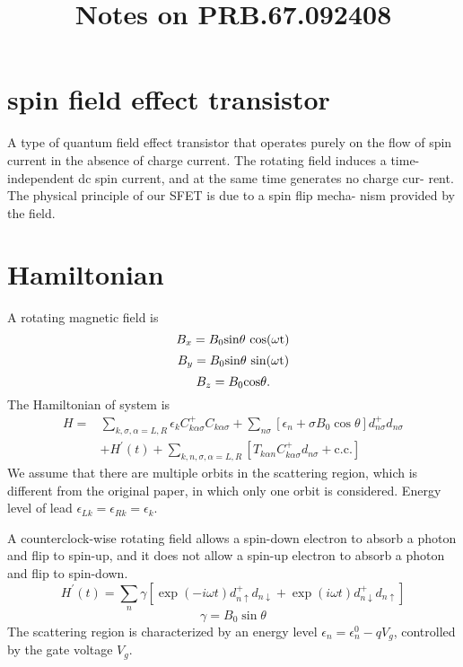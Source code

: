 \documentclass[11pt,a4paper]{article}
\begin{document}
\title{Notes on PRB.67.092408}
\date{}
\maketitle

\section{spin field effect transistor}
A type of quantum field effect transistor that operates purely on the flow of spin current in the absence of charge current. The rotating field induces a time-independent dc spin current, and at the same time generates no charge cur- rent. The physical principle of our SFET is due to a spin flip mecha- nism provided by the field.
\section{Hamiltonian}
A rotating magnetic field is
\begin{equation}
B_{x} = B_{0}\rm{sin}\theta ~\rm{cos}(\omega t)
\end{equation}
\begin{equation}
B_{y} = B_{0}\rm{sin}\theta~\rm{sin}(\omega t)
\end{equation}
\begin{equation}
B_{z} = B_{0}\rm{cos}\theta.
\end{equation}
The Hamiltonian of system is
\begin{equation}
\begin{split}
H=&\sum_{k, \sigma, \alpha=L, R} \epsilon_{k} C_{k \alpha \sigma}^{+} C_{k \alpha \sigma}+\sum_{n\sigma}\left[\epsilon_{n}+\sigma B_{0} \cos \theta\right] d_{n\sigma}^{+} d_{n\sigma}\\
&+H^{\prime}(t)+\sum_{k,n, \sigma, \alpha=L, R}\left[T_{k \alpha n} C_{k \alpha \sigma}^{+} d_{n\sigma}+\mathrm{c.c.}\right]
\end{split}
\end{equation}
We assume that there are multiple orbits in the scattering region, which is different from the original paper, in which only one orbit is considered. Energy level of lead $\epsilon_{Lk} = \epsilon_{Rk} = \epsilon_{k}$.

A counterclock-wise rotating field allows a spin-down electron to absorb a photon and flip to spin-up, and it does not allow a spin-up electron to absorb a photon and flip to spin-down.
\begin{equation}
H^{\prime}(t)=\sum_{n}\gamma\left[\exp (-i \omega t) d_{n\uparrow}^{+} d_{n\downarrow}+\exp (i \omega t) d_{n\downarrow}^{+} d_{n\uparrow}\right]
\end{equation}
\begin{equation}
\gamma=B_{0} \sin \theta
\end{equation}
The scattering region is characterized by an energy level $\epsilon_{n} = \epsilon_{n}^{0} - qV_{g}$, controlled by the gate voltage $V_{g}$.
\end{document}
